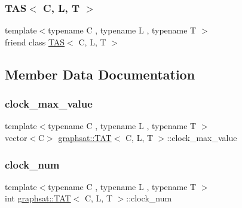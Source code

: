 \subsubsection{\texorpdfstring{TAS$<$ C, L, T $>$}{TAS< C, L, T >}}
{\footnotesize\ttfamily template$<$typename C , typename L , typename T $>$ \\
friend class \mbox{\hyperlink{classgraphsat_1_1_t_a_s}{T\+AS}}$<$ C, L, T $>$\hspace{0.3cm}{\ttfamily [friend]}}



\subsection{Member Data Documentation}
\mbox{\label{classgraphsat_1_1_t_a_t_a88d04f7de932a0118c7224cd264b444b}} 
\subsubsection{\texorpdfstring{clock\_max\_value}{clock\_max\_value}}
{\footnotesize\ttfamily template$<$typename C , typename L , typename T $>$ \\
vector$<$C$>$ \mbox{\hyperlink{classgraphsat_1_1_t_a_t}{graphsat\+::\+T\+AT}}$<$ C, L, T $>$\+::clock\+\_\+max\+\_\+value\hspace{0.3cm}{\ttfamily [private]}}

\mbox{\label{classgraphsat_1_1_t_a_t_ab96ea4a5d8f0c45be9a858710deebd77}} 
\subsubsection{\texorpdfstring{clock\_num}{clock\_num}}
{\footnotesize\ttfamily template$<$typename C , typename L , typename T $>$ \\
int \mbox{\hyperlink{classgraphsat_1_1_t_a_t}{graphsat\+::\+T\+AT}}$<$ C, L, T $>$\+::clock\+\_\+num\hspace{0.3cm}{\ttfamily [private]}}

